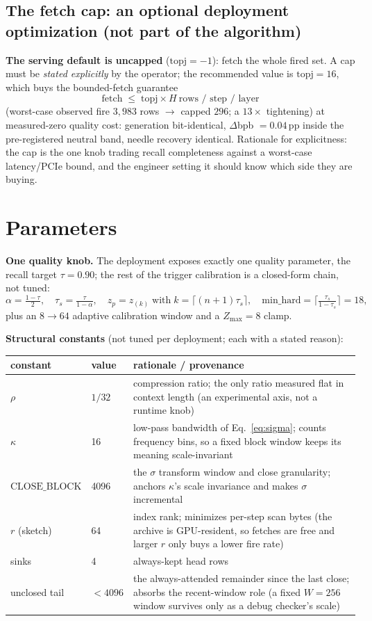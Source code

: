\documentclass[11pt]{article}
\begin{document}
\subsection{The fetch cap: an optional deployment optimization (not part of the algorithm)}
\textbf{The serving default is uncapped} ($\mathrm{topj}=-1$): fetch the
whole fired set. A cap must be \emph{stated explicitly} by the operator; the
recommended value is $\mathrm{topj}=16$, which buys the bounded-fetch
guarantee
\[
\text{fetch} \;\le\; \mathrm{topj} \times H \ \text{rows / step / layer}
\]
(worst-case observed fire $3{,}983$ rows $\to$ capped $296$; a $13\times$
tightening) at measured-zero quality cost: generation bit-identical,
$\Delta$bpb $= 0.04$\,pp inside the pre-registered neutral band, needle
recovery identical. Rationale for explicitness: the cap is the one knob
trading recall completeness against a worst-case latency/PCIe bound, and the
engineer setting it should know which side they are buying.

\section{Parameters}\label{sec:params}

\textbf{One quality knob.} The deployment exposes exactly one quality
parameter, the recall target $\tau=0.90$; the rest of the trigger
calibration is a closed-form chain, not tuned:
\[
\alpha=\tfrac{1-\tau}{2},\quad
\tau_s=\tfrac{\tau}{1-\alpha},\quad
z_p=z_{(k)}\;\text{with}\;k=\lceil(n{+}1)\tau_s\rceil,\quad
\mathrm{min\_hard}=\lceil\tfrac{\tau_s}{1-\tau_s}\rceil=18,
\]
plus an $8\!\to\!64$ adaptive calibration window and a $Z_{\max}=8$ clamp.

\textbf{Structural constants} (not tuned per deployment; each with a stated
reason):
\begin{center}\small
\begin{tabular}{@{}llp{7.1cm}@{}}
\toprule
constant & value & rationale / provenance\\
\midrule
$\rho$ & $1/32$ & compression ratio; the only ratio measured flat in context length (an experimental axis, not a runtime knob)\\
$\kappa$ & 16 & low-pass bandwidth of Eq.~\eqref{eq:sigma}; counts frequency bins, so a fixed block window keeps its meaning scale-invariant\\
$\mathrm{CLOSE\_BLOCK}$ & 4096 & the $\sigma$ transform window and close granularity; anchors $\kappa$'s scale invariance and makes $\sigma$ incremental\\
$r$ (sketch) & 64 & index rank; minimizes per-step scan bytes (the archive is GPU-resident, so fetches are free and larger $r$ only buys a lower fire rate)\\
sinks & 4 & always-kept head rows\\
unclosed tail & $<4096$ & the always-attended remainder since the last close; absorbs the recent-window role (a fixed $W{=}256$ window survives only as a debug checker's scale)\\
\bottomrule
\end{tabular}
\end{center}
\end{document}
